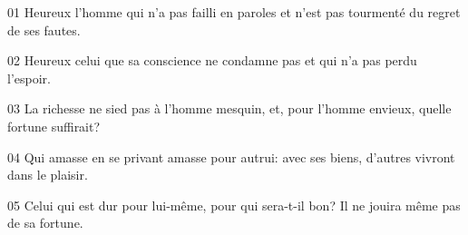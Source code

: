 01 Heureux l’homme qui n’a pas failli en paroles et n’est pas tourmenté du regret de ses fautes.

02 Heureux celui que sa conscience ne condamne pas et qui n’a pas perdu l’espoir.

03 La richesse ne sied pas à l’homme mesquin, et, pour l’homme envieux, quelle fortune suffirait?

04 Qui amasse en se privant amasse pour autrui: avec ses biens, d’autres vivront dans le plaisir.

05 Celui qui est dur pour lui-même, pour qui sera-t-il bon? Il ne jouira même pas de sa fortune.
